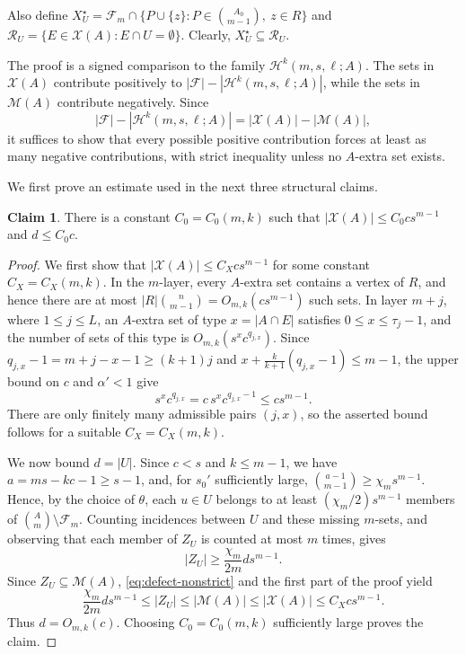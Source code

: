 \documentclass[10pt,a4paper]{article}
\numberwithin{equation}{section}
\theoremstyle{definition}
\newtheorem{claim}[claim]{Claim}
\newcommand{\F}{\mathcal F}
\newcommand{\X}{\mathcal X}
\newcommand{\M}{\mathcal M}
\newcommand{\Rcal}{\mathcal R}
\begin{document}
Also define $X_U^\star=\F_m\cap \{P\cup\{z\}:P\in\binom{A_0}{m-1},\ z\in R\}$ and $\Rcal_U=\{E\in\X(A):E\cap U=\emptyset\}$.
Clearly, $X_U^\star\subseteq\Rcal_U$.

The proof is a signed comparison to the family $\mathcal H^k(m,s,\ell;A)$.
The sets in $\X(A)$ contribute positively to $ |\F|-|\mathcal H^k(m,s,\ell;A)| $, while the sets in $\M(A)$ contribute negatively.
Since
\[
        |\F|-|\mathcal H^k(m,s,\ell;A)|=|\X(A)|-|\M(A)|,
\]
it suffices to show that every possible positive contribution forces at least as many negative contributions, with strict inequality unless no $A$-extra set exists.


We first prove an estimate used in the next three structural claims.

\begin{claim}\label{cl:defect-coarse-bounds}
        There is a constant $C_0=C_0(m,k)$ such that $|\X(A)|\le C_0cs^{m-1}$ and $d\le C_0c$.
\end{claim}

\begin{proof}
        We first show that $|\X(A)|\le C_Xcs^{m-1}$ for some constant $C_X=C_X(m,k)$.  In the $m$-layer, every
        $A$-extra set contains a vertex of $R$, and hence there are at most
        $|R|\binom n{m-1}=O_{m,k}(cs^{m-1})$ such sets.  In layer $m+j$,
        where $1\le j\le L$, an $A$-extra set of type $x=|A\cap E|$
        satisfies $0\le x\le\tau_j-1$, and the number of sets of this type
        is $O_{m,k}(s^xc^{q_{j,x}})$.  Since
        $q_{j,x}-1=m+j-x-1\ge(k+1)j$ and
        $x+\frac{k}{k+1}(q_{j,x}-1)\le m-1$, the upper bound on $c$ and
        $\alpha'<1$ give
        \[
                s^xc^{q_{j,x}}
                =c\,s^xc^{q_{j,x}-1}
                \le cs^{m-1}.
        \]
        There are only finitely many admissible pairs $(j,x)$, so the
        asserted bound follows for a suitable $C_X=C_X(m,k)$.

        We now bound $d=|U|$.  Since $c<s$ and $k\le m-1$, we have
        $a=ms-kc-1\ge s-1$, and, for $s_0'$ sufficiently large,
        $\binom{a-1}{m-1}\ge\chi_m s^{m-1}$.  Hence, by the choice of
        $\theta$, each $u\in U$ belongs to at least
        $(\chi_m/2)s^{m-1}$ members of $\binom Am\setminus\F_m$.
        Counting incidences between $U$ and these missing $m$-sets, and
        observing that each member of $Z_U$ is counted at most $m$ times,
        gives
        \[
                |Z_U|\ge\frac{\chi_m}{2m}d s^{m-1}.
        \]
        Since $Z_U\subseteq\M(A)$, \eqref{eq:defect-nonstrict} and the
        first part of the proof yield
        \[
                \frac{\chi_m}{2m}d s^{m-1}
                \le |Z_U|
                \le |\M(A)|
                \le |\X(A)|
                \le C_Xcs^{m-1}.
        \]
        Thus $d=O_{m,k}(c)$.  Choosing $C_0=C_0(m,k)$
        sufficiently large proves the claim.
\end{proof}
\end{document}
